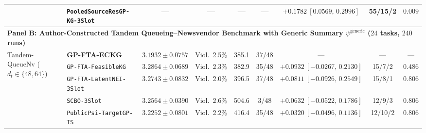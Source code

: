 \begin{table}[htbp]
{\begin{tabular}{llccccccc}
 & \texttt{PooledSourceResGP-KG-3Slot} & --- & --- & --- & --- & $+0.1782\ [0.0569,\,0.2996]$ & 55/15/2 & $0.009$ \\
\midrule
\multicolumn{9}{l}{\textbf{Panel B: Author-Constructed Tandem Queueing--Newsvendor Benchmark with Generic Summary $\psi^{\mathrm{generic}}$ ($24$ tasks, $240$ runs)}} \\
\midrule
\multirow{5}{*}{Tandem-QueueNv ($d_t\in\{48,64\}$)} & \textbf{GP-FTA-ECKG} & $\mathbf{3.1932} \pm 0.0757$ & Viol.\ 2.5\% & 385.1 & 37/48 & --- & --- & --- \\
 & \texttt{GP-FTA-FeasibleKG} & $3.2864 \pm 0.0689$ & Viol.\ 2.3\% & 382.9 & 35/48 & $+0.0932\ [-0.0267,\,0.2130]$ & 15/7/2 & $0.486$ \\
 & \texttt{GP-FTA-LatentNEI-3Slot} & $3.2743 \pm 0.0832$ & Viol.\ 2.0\% & 396.5 & 37/48 & $+0.0811\ [-0.0926,\,0.2549]$ & 15/8/1 & $0.806$ \\
 & \texttt{SCBO-3Slot} & $3.2564 \pm 0.0390$ & Viol.\ 2.6\% & 504.6 & 3/48 & $+0.0632\ [-0.0522,\,0.1786]$ & 12/9/3 & $0.806$ \\
 & \texttt{PublicPsi-TargetGP-TS} & $3.2252 \pm 0.0801$ & Viol.\ 2.2\% & 416.4 & 35/48 & $+0.0320\ [-0.0496,\,0.1136]$ & 12/10/2 & $0.806$ \\
\bottomrule
\end{tabular}%
}
\end{table}
